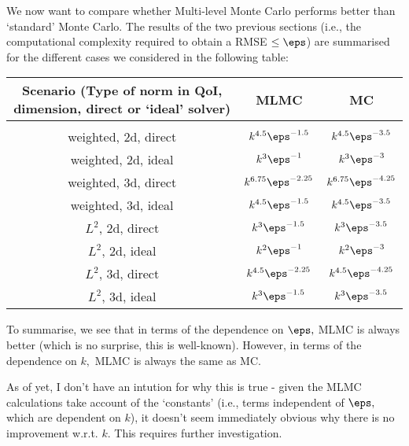 We now want to compare whether Multi-level Monte Carlo performs better than `standard' Monte Carlo. The results of the two previous sections (i.e., the computational complexity required to obtain a RMSE $\leq \eps$) are summarised for the different cases we considered in the following table:

\begin{tabular}{c|c|c}
Scenario (Type of norm in QoI, dimension, direct or `ideal' solver) & MLMC & MC \\
\hline
&&\\
weighted, 2d, direct & $k^{4.5} \eps^{-1.5}$ & $k^{4.5} \eps^{-3.5}$\\
weighted, 2d, ideal & $k^3 \eps^{-1}$ & $k^3 \eps^{-3}$\\
weighted, 3d, direct & $k^{6.75} \eps^{-2.25}$& $k^{6.75} \eps^{-4.25}$ \\
weighted, 3d, ideal & $k^{4.5} \eps^{-1.5}$& $k^{4.5} \eps^{-3.5}$ \\
$L^2$, 2d, direct & $k^3 \eps^{-1.5}$& $k^3 \eps^{-3.5}$ \\
$L^2$, 2d, ideal & $k^2 \eps^{-1}$& $k^2 \eps^{-3}$\\
$L^2$, 3d, direct & $k^{4.5} \eps^{-2.25}$& $k^{4.5} \eps^{-4.25}$ \\
$L^2$, 3d, ideal & $k^3 \eps^{-1.5}$ & $k^3 \eps^{-3.5}$ \\
\end{tabular}

To summarise, we see that in terms of the dependence on $\eps,$ MLMC is always better (which is no surprise, this is well-known). However, in terms of the dependence on $k,$ MLMC is always the same as MC.

As of yet, I don't have an intution for why this is true - given the MLMC calculations take account of the `constants' (i.e., terms independent of $\eps,$ which are dependent on $k$), it doesn't seem immediately obvious why there is no improvement w.r.t. $k.$ This requires further investigation.


